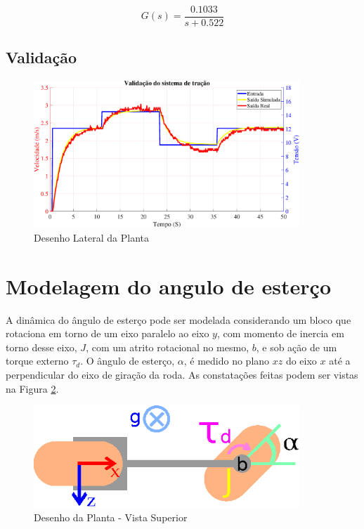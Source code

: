 	        \begin{equation}
	             G(s) = \frac{0.1033}{s + 0.522}
	        \end{equation}

        \subsection{Validação}
        
            \begin{figure}[h]
                \centering
                \includegraphics[width=10cm]{Imagens/cap4/sis_tracao/validacao.eps}
                \caption{Desenho Lateral da Planta}
                \label{img:velocidade}
            \end{figure}
	        
	\section{Modelagem do angulo de esterço} \label{sec:modelagemvangulo}
		
		A dinâmica do ângulo de esterço pode ser modelada considerando um bloco que rotaciona em torno de um eixo paralelo ao eixo $y$, com momento de inercia em torno desse eixo, $J$, com um atrito rotacional no mesmo, $b$, e sob ação de um torque externo $\tau_d$. O ângulo de esterço, $\alpha$, é medido no plano $xz$ do eixo $x$ até a perpendicular do eixo de giração da roda. As constatações feitas podem ser vistas na Figura \ref{img:alpha}.
		
		\begin{figure}[h]
            \centering
            \includegraphics[width=10cm]{Imagens/alpha.eps}
            \caption{Desenho da Planta - Vista Superior}
            \label{img:alpha}
        \end{figure}
        
